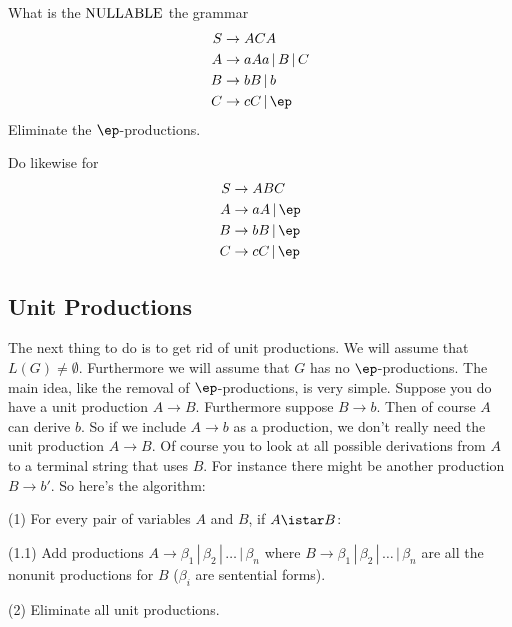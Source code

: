 \begin{eg}
What is the $\operatorname{NULLABLE}$ the grammar
\begin{align*}
S &\rightarrow ACA \\
A &\rightarrow aAa \,|\, B \,|\, C \\
B &\rightarrow bB \,|\, b \\
C &\rightarrow cC \,|\, \ep \\
\end{align*}
Eliminate the $\ep$-productions.
\end{eg}

\begin{eg}
Do likewise for
\begin{align*}
S &\rightarrow ABC \\
A &\rightarrow aA \,|\, \ep \\
B &\rightarrow bB \,|\, \ep \\
C &\rightarrow cC \,|\, \ep \\
\end{align*}
\end{eg}


\subsection{Unit Productions}

The next thing to do is to get rid of unit productions. We will
assume that $L(G) \neq \emptyset$. Furthermore we will assume that
$G$ has no $\ep$-productions. The main idea, like the removal of
$\ep$-productions, is very simple. Suppose you do have a unit
production $A \rightarrow B$. Furthermore suppose $B \rightarrow
b$. Then of course $A$ can derive $b$. So if we include $A
\rightarrow b$ as a production, we don't really need the unit
production $A \rightarrow B$. Of course you to look at all
possible derivations from $A$ to a terminal string that uses $B$.
For instance there might be another production $B \rightarrow b'$.
So here's the algorithm:

\begin{mylist}
 \item[(1)] For every pair of variables $A$ and $B$, if
 $A \istar B$:
 \begin{mylist}
  \item[(1.1)] Add productions $A \rightarrow \beta_1 \,|\, \beta_2 \,|\,
  \ldots \,|\, \beta_n$ where $B \rightarrow \beta_1 \,|\, \beta_2 \,|\,
  \ldots \,|\, \beta_n$ are all the nonunit productions for $B$
  ($\beta_i$ are sentential forms).
 \end{mylist}
 \item[(2)] Eliminate all unit productions.
\end{mylist}


